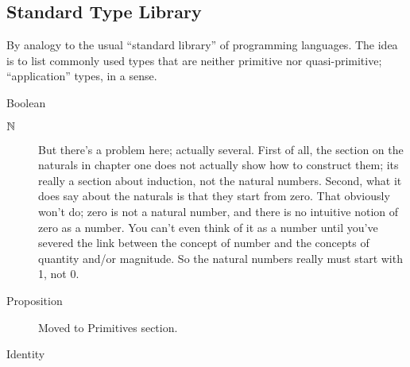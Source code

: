 \subsection{\HoTT{} Standard Type Library}
\label{subs:hottstdlib}

\begin{ednote}
  By analogy to the usual ``standard library'' of programming
  languages.  The idea is to list commonly used types that are neither
  primitive nor quasi-primitive; ``application'' types, in a sense.
\end{ednote}


\begin{description}
\item [Boolean] \citep[p. 34]{hottbook}
\item [$\mathbb{N}$] \citep[p. 36]{hottbook} But there's a problem here;
  actually several.  First of all, the section on the naturals in
  chapter one does not actually show how to construct them; its really
  a section about induction, not the natural numbers.  Second, what it
  does say about the naturals is that they start from zero.  That
  obviously won't do; zero is not a natural number, and there is no
  intuitive notion of zero as a number.  You can't even think of it as
  a number until you've severed the link between the concept of number
  and the concepts of quantity and/or magnitude.  So the natural
  numbers really must start with 1, not 0.
\item [Proposition]  Moved to Primitives section.
\item [Identity]
\end{description}

